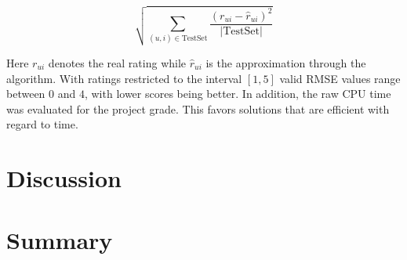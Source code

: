 \documentclass[10pt,conference,compsocconf]{IEEEtran}
\newcommand{\abs}[1]{\left\lvert#1\right\rvert}
\begin{document}
\begin{equation}
  \sqrt{\sum_{(u,i) \in \mathrm{TestSet}}
    \frac{{(r_{ui} - \hat{r}_{ui})}^2}{\abs{\mathrm{TestSet}}}}
\end{equation}

Here $r_{ui}$ denotes the real rating while $\hat{r}_{ui}$ is the approximation
through the algorithm. With ratings restricted to the interval $[1,5]$ valid
RMSE values range between $0$ and $4$, with lower scores being better. In
addition, the raw CPU time was evaluated for the project grade. This favors
solutions that are efficient with regard to time.



\section{Discussion}
\label{sec:discussion}

\section{Summary}
\label{sec:summary}

\renewcommand*{\UrlFont}{\rmfamily}
\printbibliography%
\end{document}
